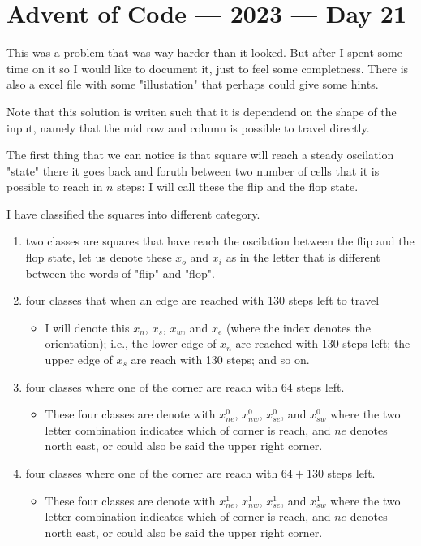 \documentclass[]{article}
\begin{document}
\section*{Advent of Code --- 2023 --- Day 21 }

This was a problem that was way harder than it looked. But after I spent some time on it so I would like to document it, just to feel some completness. There is also a excel file with some "illustation" that perhaps could give some hints. 

Note that this solution is writen such that it is dependend on the shape of the input, namely that the mid row and column is possible to travel directly. 

The first thing that we can notice is that square will reach a steady oscilation "state" there it goes back and foruth between two number of cells that it is possible to reach in $n$ steps: I will call these the flip and the flop state. 

 I have classified the squares into different category. 
 \begin{enumerate}
     \item two classes are squares that have reach the oscilation between the flip and the flop state, let us denote these $x_o$ and $x_i$ as in the letter that is different between the words of "flip" and "flop". 
     \item four classes that when an edge are reached with 130 steps left to travel 
     \begin{itemize}
         \item I will denote this $x_n$, $x_s$, $x_w$, and $x_e$ (where the index denotes the orientation); i.e., the lower edge of $x_n$ are reached with 130 steps left; the upper edge of $x_s$ are reach with 130 steps; and so on. 
     \end{itemize}
     \item four classes where one of the corner are reach with 64 steps left. 
     \begin{itemize}
         \item These four classes are denote with $x_{ne}^0$, $x_{nw}^0$, $x_{se}^0$, and $x_{sw}^0$ where the two letter combination indicates which of corner is reach, and $ne$ denotes north east, or could also be said the upper right corner. 
     \end{itemize}
     \item four classes where one of the corner are reach with $64+130$ steps left. 
     \begin{itemize}
         \item These four classes are denote with $x_{ne}^1$, $x_{nw}^1$, $x_{se}^1$, and $x_{sw}^1$ where the two letter combination indicates which of corner is reach, and $ne$ denotes north east, or could also be said the upper right corner. 
     \end{itemize}
 \end{enumerate}
\end{document}
